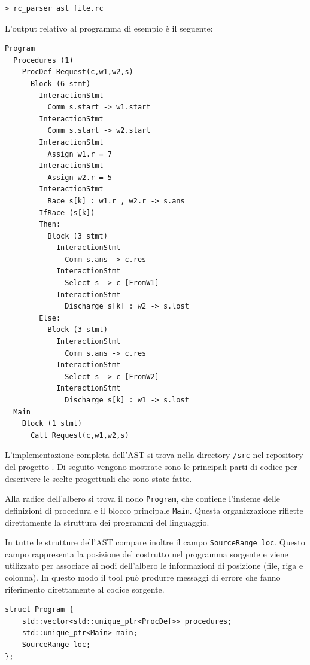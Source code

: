 \begin{tcolorbox}[colback=black!2,colframe=black!35,boxrule=0.4pt]
\begin{verbatim}
> rc_parser ast file.rc
\end{verbatim}
\end{tcolorbox}
L’output relativo al programma di esempio è il seguente:
\begin{tcolorbox}[colback=black!2,colframe=black!35,boxrule=0.4pt]
\small
\begin{verbatim}
Program
  Procedures (1)
    ProcDef Request(c,w1,w2,s)
      Block (6 stmt)
        InteractionStmt
          Comm s.start -> w1.start
        InteractionStmt
          Comm s.start -> w2.start
        InteractionStmt
          Assign w1.r = 7
        InteractionStmt
          Assign w2.r = 5
        InteractionStmt
          Race s[k] : w1.r , w2.r -> s.ans
        IfRace (s[k])
        Then:
          Block (3 stmt)
            InteractionStmt
              Comm s.ans -> c.res
            InteractionStmt
              Select s -> c [FromW1]
            InteractionStmt
              Discharge s[k] : w2 -> s.lost
        Else:
          Block (3 stmt)
            InteractionStmt
              Comm s.ans -> c.res
            InteractionStmt
              Select s -> c [FromW2]
            InteractionStmt
              Discharge s[k] : w1 -> s.lost
  Main
    Block (1 stmt)
      Call Request(c,w1,w2,s)
\end{verbatim}
\end{tcolorbox}

L'implementazione completa dell'AST si trova nella directory \texttt{/src} nel repository del progetto \cite{rcparserrepo}. Di seguito vengono mostrate sono le principali parti di codice per descrivere le scelte progettuali che sono state fatte.

Alla radice dell’albero si trova il nodo \texttt{Program}, che contiene l’insieme delle definizioni di procedura e il blocco principale \texttt{Main}. Questa organizzazione riflette direttamente la struttura dei programmi del linguaggio.

In tutte le strutture dell’AST compare inoltre il campo \texttt{SourceRange loc}. Questo campo rappresenta la posizione del costrutto nel programma sorgente e viene utilizzato per associare ai nodi dell’albero le informazioni di posizione (file, riga e colonna). In questo modo il tool può produrre messaggi di errore che fanno riferimento direttamente al codice sorgente.

\begin{tcolorbox}[colback=white,colframe=black!35,boxrule=0.4pt]
\begin{lstlisting}
struct Program {
    std::vector<std::unique_ptr<ProcDef>> procedures;
    std::unique_ptr<Main> main;
    SourceRange loc;
};
\end{lstlisting}
\end{tcolorbox}

